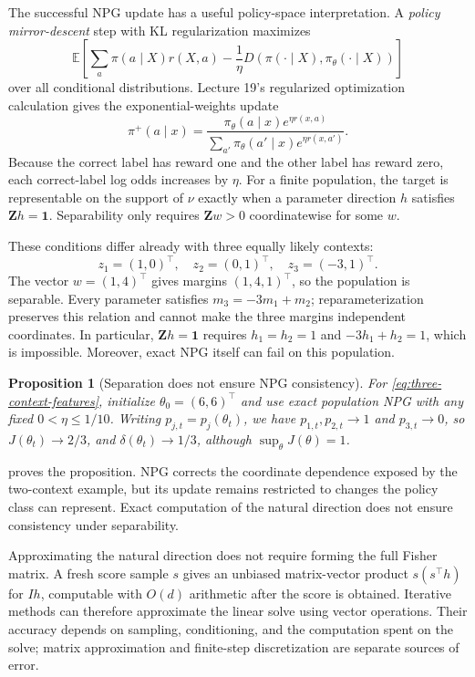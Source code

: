 \documentclass[11pt,twoside]{article}
\newcommand{\E}{\mathbb E}
\newcommand{\KL}{D}
\newtheorem{proposition}[theorem]{Proposition}
\theoremstyle{definition}
\theoremstyle{remark}
\begin{document}
The successful NPG update has a useful policy-space interpretation. A
\emph{policy mirror-descent} step with KL regularization maximizes
\[
 \E\left[\sum_a\pi(a\mid X)r(X,a)
 -\frac1\eta\KL(\pi(\cdot\mid X),\pi_\theta(\cdot\mid X))\right]
\]
over all conditional distributions. Lecture 19's regularized optimization
calculation gives the exponential-weights update
\begin{equation}
 \pi^+(a\mid x)=
 \frac{\pi_\theta(a\mid x)e^{\eta r(x,a)}}
 {\sum_{a'}\pi_\theta(a'\mid x)e^{\eta r(x,a')}}.
 \label{eq:context-mirror}
\end{equation}
Because the correct label has reward one and the other label has reward
zero, each correct-label log odds increases by $\eta$.
For a finite population, the target is representable on the support of
$\nu$ exactly
when a parameter direction $h$ satisfies $\mathbf Z h=\mathbf1$.
Separability only requires $\mathbf Z w>0$ coordinatewise for some $w$.

These conditions differ already with three equally likely contexts:
\begin{equation}
 z_1=(1,0)^\top,\quad z_2=(0,1)^\top,\quad z_3=(-3,1)^\top.
 \label{eq:three-context-features}
\end{equation}
The vector $w=(1,4)^\top$ gives margins $(1,4,1)^\top$, so the
population is separable. Every parameter satisfies $m_3=-3m_1+m_2$;
reparameterization preserves this relation and cannot make the three
margins independent coordinates. In particular, $\mathbf Z h=\mathbf1$ requires
$h_1=h_2=1$ and $-3h_1+h_2=1$, which is impossible. Moreover, exact NPG itself
can fail on this population.

\begin{proposition}[Separation does not ensure NPG consistency]
\label{prop:shared-npg}
For \cref{eq:three-context-features}, initialize $\theta_0=(6,6)^\top$
and use exact population NPG with any fixed $0<\eta\le1/10$.
Writing $p_{j,t}=p_j(\theta_t)$, we have $p_{1,t},p_{2,t}\to1$ and
$p_{3,t}\to0$, so $J(\theta_t)\to2/3$,
and $\delta(\theta_t)\to1/3$, although $\sup_\theta J(\theta)=1$.
\end{proposition}

 proves the proposition. NPG corrects the coordinate
dependence exposed by the two-context example, but its update remains
restricted to changes the policy class can represent. Exact computation
of the natural direction does not ensure consistency under separability.

Approximating the natural direction does not require forming the full
Fisher matrix. A fresh score sample $s$ gives an unbiased matrix-vector
product $s(s^\top h)$ for $Ih$, computable with $O(d)$ arithmetic after
the score is obtained. Iterative methods can therefore approximate the
linear solve using vector operations. Their accuracy depends on sampling,
conditioning, and the computation spent on the solve; matrix approximation
and finite-step discretization are separate sources of error.
\end{document}
